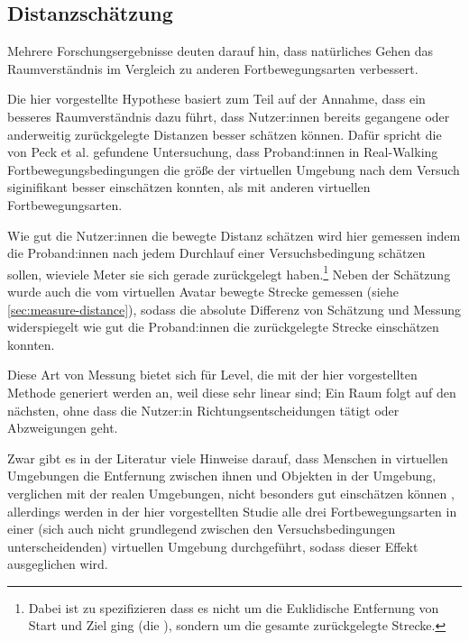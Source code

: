         \subsection{Distanzschätzung}
            Mehrere Forschungsergebnisse deuten darauf hin, dass natürliches Gehen das Raumverständnis im Vergleich zu anderen Fortbewegungsarten verbessert. \cite{langbehn-vergleich-2018,peck-vergleich-2011, walking-improves-map-building} %

            Die hier vorgestellte Hypothese basiert zum Teil auf der Annahme, dass ein besseres Raumverständnis dazu führt, dass Nutzer:innen bereits gegangene oder anderweitig zurückgelegte Distanzen besser schätzen können. Dafür spricht die von Peck et al. \cite{peck-vergleich-2011} gefundene Untersuchung, dass Proband:innen in Real-Walking Fortbewegungsbedingungen die größe der virtuellen Umgebung nach dem Versuch siginifikant besser einschätzen konnten, als mit anderen virtuellen Fortbewegungsarten.

            Wie gut die Nutzer:innen die bewegte Distanz schätzen wird hier gemessen indem die Proband:innen nach jedem Durchlauf einer Versuchsbedingung schätzen sollen, wieviele Meter sie sich gerade zurückgelegt haben.\footnote{Dabei ist zu spezifizieren dass es nicht um die Euklidische Entfernung von Start und Ziel ging (die ), sondern um die gesamte zurückgelegte Strecke.}
            Neben der Schätzung wurde auch die vom virtuellen Avatar bewegte Strecke gemessen (siehe \autoref{sec:measure-distance}), sodass die absolute Differenz von Schätzung und Messung widerspiegelt wie gut die Proband:innen die zurückgelegte Strecke einschätzen konnten.

            Diese Art von Messung bietet sich für Level, die mit der hier vorgestellten Methode generiert werden an, weil diese sehr linear sind; Ein Raum folgt auf den nächsten, ohne dass die Nutzer:in Richtungsentscheidungen tätigt oder Abzweigungen geht.

            Zwar gibt es in der Literatur viele Hinweise darauf, dass Menschen in virtuellen Umgebungen die Entfernung zwischen ihnen und Objekten in der Umgebung, verglichen mit der realen Umgebungen,  nicht besonders gut einschätzen können \cite{meta-distance-perception, bruder-distance}, %
            allerdings werden in der hier vorgestellten Studie alle drei Fortbewegungsarten in einer (sich auch nicht grundlegend zwischen den Versuchsbedingungen unterscheidenden) virtuellen Umgebung durchgeführt, sodass dieser Effekt ausgeglichen wird.

